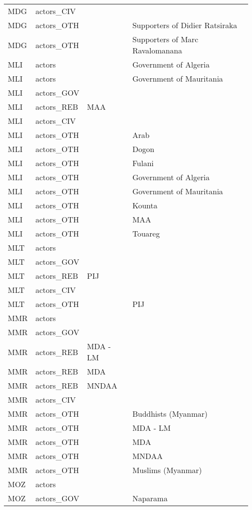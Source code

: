 \begin{table}[ht]
\begin{tabular}{llll}
  MDG & actors\_CIV &  &  \\ 
  MDG & actors\_OTH &  & Supporters of Didier Ratsiraka \\ 
  MDG & actors\_OTH &  & Supporters of Marc Ravalomanana \\ 
  MLI & actors &  & Government of Algeria \\ 
  MLI & actors &  & Government of Mauritania \\ 
  MLI & actors\_GOV &  &  \\ 
  MLI & actors\_REB & MAA &  \\ 
  MLI & actors\_CIV &  &  \\ 
  MLI & actors\_OTH &  & Arab \\ 
  MLI & actors\_OTH &  & Dogon \\ 
  MLI & actors\_OTH &  & Fulani \\ 
  MLI & actors\_OTH &  & Government of Algeria \\ 
  MLI & actors\_OTH &  & Government of Mauritania \\ 
  MLI & actors\_OTH &  & Kounta \\ 
  MLI & actors\_OTH &  & MAA \\ 
  MLI & actors\_OTH &  & Touareg \\ 
  MLT & actors &  &  \\ 
  MLT & actors\_GOV &  &  \\ 
  MLT & actors\_REB & PIJ &  \\ 
  MLT & actors\_CIV &  &  \\ 
  MLT & actors\_OTH &  & PIJ \\ 
  MMR & actors &  &  \\ 
  MMR & actors\_GOV &  &  \\ 
  MMR & actors\_REB & MDA - LM &  \\ 
  MMR & actors\_REB & MDA &  \\ 
  MMR & actors\_REB & MNDAA &  \\ 
  MMR & actors\_CIV &  &  \\ 
  MMR & actors\_OTH &  & Buddhists (Myanmar) \\ 
  MMR & actors\_OTH &  & MDA - LM \\ 
  MMR & actors\_OTH &  & MDA \\ 
  MMR & actors\_OTH &  & MNDAA \\ 
  MMR & actors\_OTH &  & Muslims (Myanmar) \\ 
  MOZ & actors &  &  \\ 
  MOZ & actors\_GOV &  & Naparama \\ 

\end{tabular}
\end{table}
